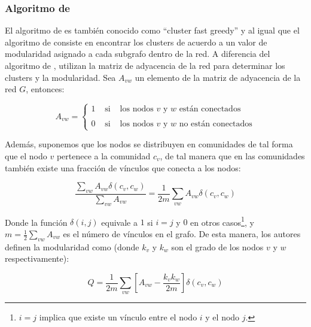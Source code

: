 \documentclass[12pt,letter]{article}
\begin{document}
\subsubsection{Algoritmo de \cite{Clauset}}
El algoritmo de \cite{Clauset} es también conocido como ``cluster fast greedy'' y al igual que el algoritmo de \cite{Brandes} consiste en encontrar los clusters de acuerdo a un valor de modularidad asignado a cada subgrafo dentro de la red. A diferencia del algoritmo de \cite{Brandes}, \cite{Clauset} utilizan la matriz de adyacencia de la red para determinar los clusters y la modularidad. Sea $A_{vw}$ un elemento de la matriz de adyacencia de la red $G$, entonces:

\begin{equation}
A_{vw}=
\left \{
\begin{array}{lcl}
1 & \mbox{ si} & \mbox{ los} \mbox{ nodos } v \mbox{ y } w \mbox{ están conectados} \\
   &                 & \\
0 & \mbox{ si} &  \mbox{ los} \mbox{ nodos } v \mbox{ y } w \mbox{ no están conectados}
\end{array}
\right.
\end{equation}

\vspace{0.5cm}

Además, suponemos que los nodos se distribuyen en comunidades de tal forma que el nodo $v$ pertenece a la comunidad $c_{v}$, de tal manera que en las comunidades también existe una fracción de vínculos que conecta a los nodos:

\begin{equation}
\frac{\sum_{vw}A_{vw}\delta(c_v,c_w)}{\sum_{vw}A_{vw}}=\frac{1}{2m}\sum_{vw}A_{vw}\delta(c_v,c_w)
\end{equation}

\vspace{0.5cm}

Donde la función $\delta(i, j)$ equivale a $1$ si $i = j$ y $0$ en otros casos\footnote{$i = j$ implica que existe un vínculo entre el nodo $i$ y el nodo $j$.}, y $m=\frac{1}{2}\sum_{vw}A_{vw}$ es el número de vínculos en el grafo. De esta manera, los autores definen la modularidad como (donde $k_v$ y $k_w$ son el grado de los nodos $v$ y $w$ respectivamente):

\begin{equation}
Q=\frac{1}{2m}\sum_{vw}\left[A_{vw}-\frac{k_vk_w}{2m}\right]\delta(c_v,c_w)
\end{equation}
\end{document}

